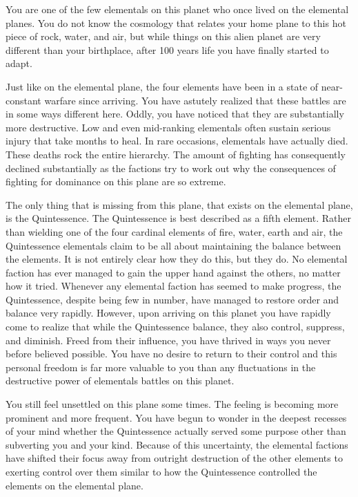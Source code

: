 \documentclass[blue]{elementals}
\begin{document}
\name{\bKnowQ{}}

You are one of the few elementals on this planet who once lived on the elemental planes. You do not know the cosmology that relates your home plane to this hot piece of rock, water, and air, but while things on this alien planet are very different than your birthplace, after 100 years life you have finally started to adapt.

Just like on the elemental plane, the four elements have been in a state of near-constant warfare since arriving. You have astutely realized that these battles are in some ways different here. Oddly, you have noticed that they are substantially more destructive. Low and even mid-ranking elementals often sustain serious injury that take months to heal. In rare occasions, elementals have actually died. These deaths rock the entire hierarchy. The amount of fighting has consequently declined substantially as the factions try to work out why the consequences of fighting for dominance on this plane are so extreme.

The only thing that is missing from this plane, that exists on the elemental plane, is the Quintessence. The Quintessence is best described as a fifth element. Rather than wielding one of the four cardinal elements of fire, water, earth and air, the Quintessence elementals claim to be all about maintaining the balance between the elements. It is not entirely clear how they do this, but they do. No elemental faction has ever managed to gain the upper hand against the others, no matter how it tried. Whenever any elemental faction has seemed to make progress, the Quintessence, despite being few in number, have managed to restore order and balance very rapidly. However, upon arriving on this planet you have rapidly come to realize that while the Quintessence balance, they also control, suppress, and diminish. Freed from their influence, you have thrived in ways you never before believed possible. You have no desire to return to their control and this personal freedom is far more valuable to you than any fluctuations in the destructive power of elementals battles on this planet.

You still feel unsettled on this plane some times. The feeling is becoming more prominent and more frequent. You have begun to wonder in the deepest recesses of your mind whether the Quintessence actually served some purpose other than subverting you and your kind. Because of this uncertainty, the elemental factions have shifted their focus away from outright destruction of the other elements to exerting control over them similar to how the Quintessence controlled the elements on the elemental plane.
\end{document}
